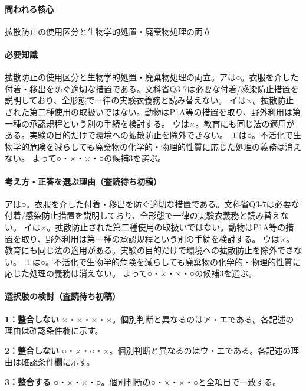 \paragraph{問われる核心} 拡散防止の使用区分と生物学的処置・廃棄物処理の両立

\paragraph{必要知識} 拡散防止の使用区分と生物学的処置・廃棄物処理の両立。アは○。衣服を介した付着・移出を防ぐ適切な措置である。文科省Q3-7は必要な付着/感染防止措置を説明しており、全形態で一律の実験衣義務と読み替えない。 イは×。拡散防止された第二種使用の取扱いではない。動物はP1A等の措置を取り、野外利用は第一種の承認規程という別の手続を検討する。 ウは×。教育にも同じ法の適用がある。実験の目的だけで環境への拡散防止を除外できない。 エは○。不活化で生物学的危険を減らしても廃棄物の化学的・物理的性質に応じた処理の義務は消えない。 よって○・×・×・○の候補3を選ぶ。

\paragraph{考え方・正答を選ぶ理由（査読待ち初稿）} アは○。衣服を介した付着・移出を防ぐ適切な措置である。文科省Q3-7は必要な付着/感染防止措置を説明しており、全形態で一律の実験衣義務と読み替えない。 イは×。拡散防止された第二種使用の取扱いではない。動物はP1A等の措置を取り、野外利用は第一種の承認規程という別の手続を検討する。 ウは×。教育にも同じ法の適用がある。実験の目的だけで環境への拡散防止を除外できない。 エは○。不活化で生物学的危険を減らしても廃棄物の化学的・物理的性質に応じた処理の義務は消えない。 よって○・×・×・○の候補3を選ぶ。

\paragraph{選択肢の検討（査読待ち初稿）}\mbox{}\par

\noindent\textbf{1：整合しない} ×・×・×・×。個別判断と異なるのはア・エである。各記述の理由は確認条件欄に示す。\par

\noindent\textbf{2：整合しない} ○・×・○・×。個別判断と異なるのはウ・エである。各記述の理由は確認条件欄に示す。\par

\noindent\textbf{3：整合する} ○・×・×・○。個別判断の○・×・×・○と全項目で一致する。\par

